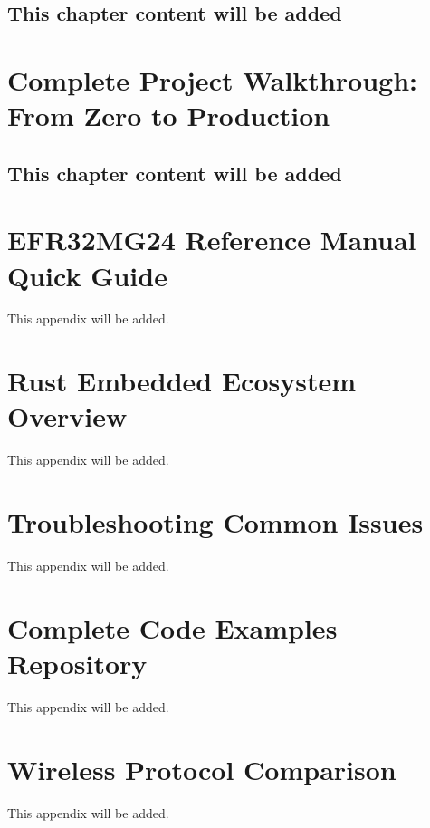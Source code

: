 \documentclass[11pt,a4paper,twoside,openright]{book}
\begin{document}
\section*{This chapter content will be added}
\clearpage

\chapter{Complete Project Walkthrough: From Zero to Production}
\label{ch:chapter-18}
\section*{This chapter content will be added}
\clearpage

\appendix

\chapter{EFR32MG24 Reference Manual Quick Guide}
\label{ap:appendix-a}
This appendix will be added.
\clearpage

\chapter{Rust Embedded Ecosystem Overview}
\label{ap:appendix-b}
This appendix will be added.
\clearpage

\chapter{Troubleshooting Common Issues}
\label{ap:appendix-c}
This appendix will be added.
\clearpage

\chapter{Complete Code Examples Repository}
\label{ap:appendix-d}
This appendix will be added.
\clearpage

\chapter{Wireless Protocol Comparison}
\label{ap:appendix-e}
This appendix will be added.
\clearpage

\backmatter

\printglossary[title=Glossary,toctitle={Glossary of Terms}]
\clearpage
\end{document}
